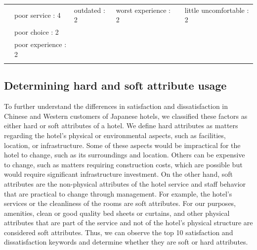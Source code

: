 \documentclass[smallextended,natbib]{svjour3}       %
\begin{document}
\begin{landscape}
\begin{table}[p]
{\begin{tabular}{|c|l|l|l|l|l|}
         &
          poor service : 4 &
          outdated : 2 &
          worst experience : 2 &
           &
          little uncomfortable : 2 \\
         &
          poor choice : 2 &
           &
           &
           &
           \\
         &
          poor experience : 2 &
           &
           &
           &
           \\
         &
           &
           &
           &
           &
           \\ \hline
        \end{tabular}%
        }
    \end{table}
    \end{landscape}

  \subsection{Determining hard and soft attribute usage}\label{det_hard_soft}

    To further understand the differences in satisfaction and dissatisfaction in Chinese and Western customers of Japanese hotels, we classified these factors as either hard or soft attributes of a hotel. We define hard attributes as matters regarding the hotel's physical or environmental aspects, such as facilities, location, or infrastructure. Some of these aspects would be impractical for the hotel to change, such as its surroundings and location. Others can be expensive to change, such as matters requiring construction costs, which are possible but would require significant infrastructure investment. On the other hand, soft attributes are the non-physical attributes of the hotel service and staff behavior that are practical to change through management. For example, the hotel's services or the cleanliness of the rooms are soft attributes. For our purposes, amenities, clean or good quality bed sheets or curtains, and other physical attributes that are part of the service and not of the hotel's physical structure are considered soft attributes. Thus, we can observe the top 10 satisfaction and dissatisfaction keywords and determine whether they are soft or hard attributes.
\end{document}
